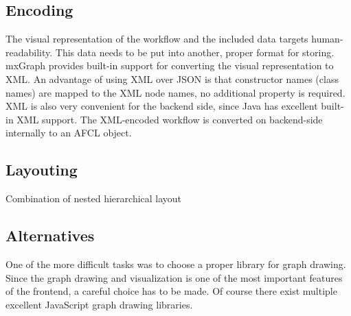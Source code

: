 \documentclass[a4paper,12pt,pdftex,halfparskip,cleardoubleempty,bibtotoc,liststotoc]{scrbook}
\begin{document}
\subsection{Encoding}

The visual representation of the workflow and the included data targets human-readability. This data needs to be put into another, proper format for storing. mxGraph provides built-in support for converting the visual representation to XML. An advantage of using XML over JSON is that constructor names (class names) are mapped to the XML node names, no additional property is required.
XML is also very convenient for the backend side, since Java has excellent built-in XML support. The XML-encoded workflow is converted on backend-side internally to an AFCL object.

\subsection{Layouting}

Combination of nested hierarchical layout

\label{sec:graph-alternatives}
\subsection{Alternatives}

One of the more difficult tasks was to choose a proper library for graph drawing. Since the graph drawing and visualization is one of the most important features of the frontend, a careful choice has to be made. Of course there exist multiple excellent JavaScript graph drawing libraries.
\end{document}
